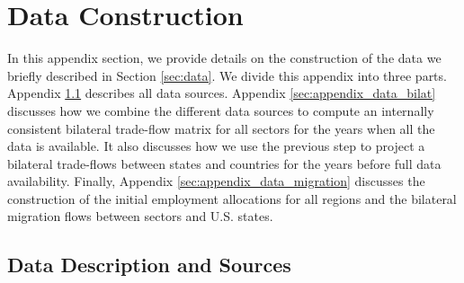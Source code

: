 \documentclass[12pt]{article}
\begin{document}
\let\normalsize\small
\appendix
\small

\section{Data Construction} \label{sec:appendix_data}

In this appendix section, we provide details on the construction of the data we briefly described in Section \ref{sec:data}. We divide this appendix into three parts. Appendix \ref{sec:appendix_data_sources} describes all data sources. Appendix \ref{sec:appendix_data_bilat} discusses how we combine the different data sources to compute an internally consistent bilateral trade-flow matrix for all sectors for the years when all the data is available. It also discusses how we use the previous step to project a bilateral trade-flows between states and countries for the years before full data availability. Finally, Appendix \ref{sec:appendix_data_migration} discusses the construction of the initial employment allocations for all regions and the  bilateral migration flows between sectors and U.S. states.

\subsection{Data Description and Sources}\label{sec:appendix_data_sources}
\end{document}
